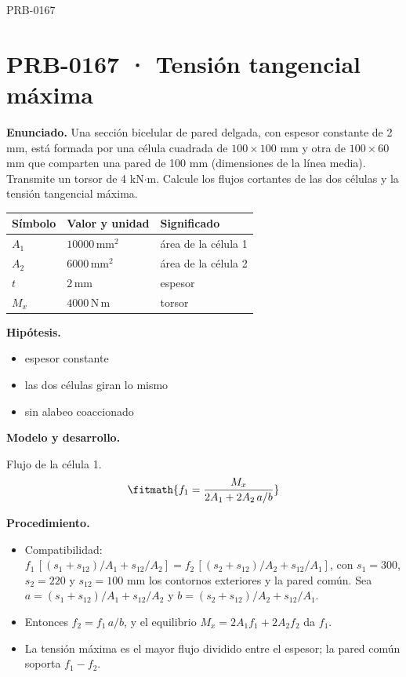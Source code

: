 \Needspace{.3\textheight}

\begin{studiumworked}{PRB-0167}

\section{PRB-0167 · Tensión tangencial máxima}

\textbf{Enunciado.} Una sección bicelular de pared delgada, con espesor constante de 2 mm, está formada por una célula cuadrada de $100\times 100$ mm y otra de $100\times 60$ mm que comparten una pared de 100 mm (dimensiones de la línea media). Transmite un torsor de 4 kN$\cdot$m. Calcule los flujos cortantes de las dos células y la tensión tangencial máxima.

\par\medskip\noindent\begin{tabular}{@{}p{.18\linewidth}p{.26\linewidth}p{.48\linewidth}@{}}
\toprule Símbolo & Valor y unidad & Significado\\\midrule
$A_{1}$ & $10000\,\mathrm{mm^2}$ & área de la célula 1\\
$A_{2}$ & $6000\,\mathrm{mm^2}$ & área de la célula 2\\
$t$ & $2\,\mathrm{mm}$ & espesor\\
$M_{x}$ & $4000\,\mathrm{N\,m}$ & torsor\\
\bottomrule\end{tabular}\par\medskip

\textbf{Hipótesis.}\begin{itemize}\item espesor constante
\item las dos células giran lo mismo
\item sin alabeo coaccionado\end{itemize}

\textbf{Modelo y desarrollo.}

Flujo de la célula 1.\[\fitmath{f_1 = \frac{M_x}{2A_1 + 2A_2\,a/b}}\]

\textbf{Procedimiento.}\begin{itemize}\item Compatibilidad: $f_1\,[(s_1 + s_{12})/A_1 + s_{12}/A_2] = f_2\,[(s_2 + s_{12})/A_2 + s_{12}/A_1]$, con $s_1 = 300$, $s_2 = 220$ y $s_{12} = 100$ mm los contornos exteriores y la pared común. Sea $a = (s_1 + s_{12})/A_1 + s_{12}/A_2$ y $b = (s_2 + s_{12})/A_2 + s_{12}/A_1$.
\item Entonces $f_2 = f_1\,a/b$, y el equilibrio $M_x = 2A_1 f_1 + 2A_2 f_2$ da $f_1$.
\item La tensión máxima es el mayor flujo dividido entre el espesor; la pared común soporta $f_1 - f_2$.\end{itemize}


\end{studiumworked}
